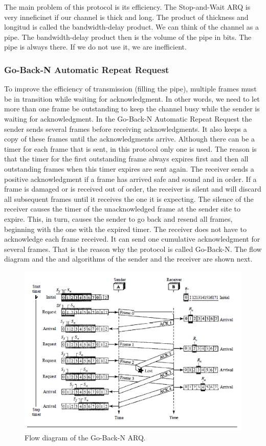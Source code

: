 The main problem of this protocol is its efficiency. The Stop-and-Wait ARQ is very inneficinet if our channel is thick and long. The product of thickness and longitud is called the bandwidth-delay product. We can think of the channel as a pipe. The bandwidth-delay product then is the volume of the pipe in bits. The pipe is always there. If we do not use it, we are inefficient. 

\subsubsection{Go-Back-N Automatic Repeat Request}
To improve the efficiency of transmission (filling the pipe), multiple frames must be in transition while waiting for acknowledgment. In other words, we need to let more than one frame be outstanding to keep the channel busy while the sender is waiting for acknowledgment. In the Go-Back-N Automatic Repeat Request the sender sends several frames before receiving acknowledgments. It also keeps a copy of these frames until the acknowledgments arrive. Although there can be a timer for each frame that is sent, in this protocol only one is used. The reason is that the timer for the first outstanding frame always expires first and then all outstanding frames when this timer expires are sent again. The receiver sends a positive acknowledgment if a frame has arrived safe and sound and in order. If a frame is damaged or is received out of order, the receiver is silent and will discard all subsequent frames until it receives the one it is expecting. The silence of the receiver causes the timer of the unacknowledged frame at the sender site to expire. This, in turn, causes the sender to go back and resend all frames, beginning with the one with the expired timer. The receiver does not have to acknowledge each frame received. It can send one cumulative acknowledgment for several frames. That is the reason why the protocol is called Go-Back-N. The flow diagram and the and algorithms of the sender and the receiver are shown next. 

\begin{figure}[H]
\begin{center}
\includegraphics[scale=1]{diagramN.PNG}  
\caption{Flow diagram of the Go-Back-N ARQ.}
\end{center}
\end{figure} 


